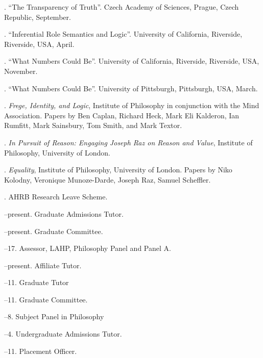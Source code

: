 \documentclass[11pt]{article}
\begin{document}
. ``The Transparency of Truth''. Czech Academy of Sciences, Prague, Czech Republic, September.

. ``Inferential Role Semantics and Logic''. University of California, Riverside, Riverside, USA, April.

. ``What Numbers Could Be''. University of California, Riverside, Riverside, USA, November.

. ``What Numbers Could Be''. University of Pittsburgh, Pittsburgh, USA, March.



\bigskip

\medskip

. \emph{Frege, Identity, and Logic}, Institute of Philosophy in conjunction with the Mind Association. Papers by Ben Caplan, Richard Heck, Mark Eli Kalderon, Ian Rumfitt, Mark Sainsbury, Tom Smith, and Mark Textor.

. \emph{In Pursuit of Reason: Engaging Joseph Raz on Reason and Value}, Institute of Philosophy, University of London.

. \emph{Equality}, Institute of Philosophy, University of London. Papers by Niko Kolodny, Veronique Munoze-Darde, Joseph Raz, Samuel Scheffler.

\bigskip

\medskip
  
. AHRB Research Leave Scheme.

\bigskip 

\medskip

--present. Graduate Admissions Tutor.

--present. Graduate Committee.

--17. Assessor, LAHP, Philosophy Panel and Panel A.

--present. Affiliate Tutor.

--11. Graduate Tutor

--11. Graduate Committee.

--8. Subject Panel in Philosophy

--4. Undergraduate Admissions Tutor.

--11. Placement Officer.

\bigskip

\medskip
\end{document}
